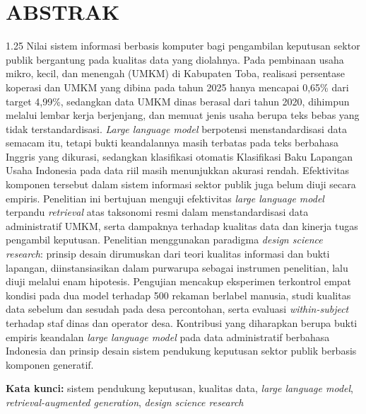 \documentclass[12pt,a4paper]{report}
\begin{document}
\chapter*{\centering ABSTRAK}

\begin{spacing}{1.25}
\noindent Nilai sistem informasi berbasis komputer bagi pengambilan keputusan sektor publik bergantung pada kualitas data yang diolahnya. Pada pembinaan usaha mikro, kecil, dan menengah (UMKM) di Kabupaten Toba, realisasi persentase koperasi dan UMKM yang dibina pada tahun 2025 hanya mencapai 0,65\% dari target 4,99\%, sedangkan data UMKM dinas berasal dari tahun 2020, dihimpun melalui lembar kerja berjenjang, dan memuat jenis usaha berupa teks bebas yang tidak terstandardisasi. \textit{Large language model} berpotensi menstandardisasi data semacam itu, tetapi bukti keandalannya masih terbatas pada teks berbahasa Inggris yang dikurasi, sedangkan klasifikasi otomatis Klasifikasi Baku Lapangan Usaha Indonesia pada data riil masih menunjukkan akurasi rendah. Efektivitas komponen tersebut dalam sistem informasi sektor publik juga belum diuji secara empiris. Penelitian ini bertujuan menguji efektivitas \textit{large language model} terpandu \textit{retrieval} atas taksonomi resmi dalam menstandardisasi data administratif UMKM, serta dampaknya terhadap kualitas data dan kinerja tugas pengambil keputusan. Penelitian menggunakan paradigma \textit{design science research}: prinsip desain dirumuskan dari teori kualitas informasi dan bukti lapangan, diinstansiasikan dalam purwarupa sebagai instrumen penelitian, lalu diuji melalui enam hipotesis. Pengujian mencakup eksperimen terkontrol empat kondisi pada dua model terhadap 500 rekaman berlabel manusia, studi kualitas data sebelum dan sesudah pada desa percontohan, serta evaluasi \textit{within-subject} terhadap staf dinas dan operator desa. Kontribusi yang diharapkan berupa bukti empiris keandalan \textit{large language model} pada data administratif berbahasa Indonesia dan prinsip desain sistem pendukung keputusan sektor publik berbasis komponen generatif.\par\medskip

\noindent\textbf{Kata kunci:} sistem pendukung keputusan, kualitas data, \textit{large language model}, \textit{retrieval-augmented generation}, \textit{design science research}
\end{spacing}
\end{document}
